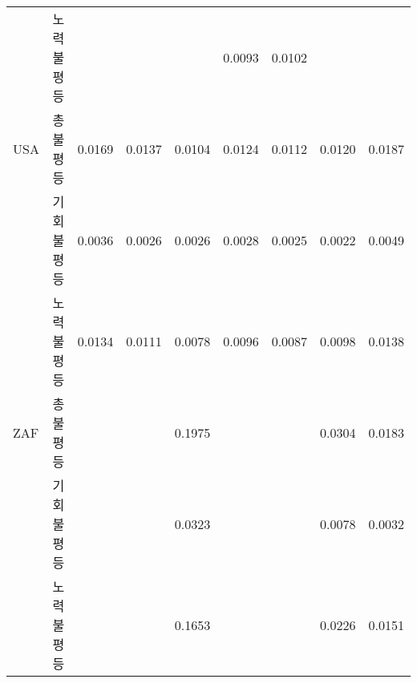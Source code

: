 \begin{longtable}{cc|rrrrrrr}
          & 노력불평등 &       &       &       & 0.0093 & 0.0102 &       & \multicolumn{1}{l}{         } \\
    \multicolumn{1}{l}{USA} & 총불평등  & 0.0169 & 0.0137 & 0.0104 & 0.0124 & 0.0112 & 0.0120 & 0.0187 \\
          & 기회불평등 & 0.0036 & 0.0026 & 0.0026 & 0.0028 & 0.0025 & 0.0022 & 0.0049 \\
          & 노력불평등 & 0.0134 & 0.0111 & 0.0078 & 0.0096 & 0.0087 & 0.0098 & 0.0138 \\
    \multicolumn{1}{l}{ZAF} & 총불평등  &       &       & 0.1975 &       &       & 0.0304 & 0.0183 \\
          & 기회불평등 &       &       & 0.0323 &       &       & 0.0078 & 0.0032 \\
          & 노력불평등 &       &       & 0.1653 &       &       & 0.0226 & 0.0151 \\
\end{longtable}%